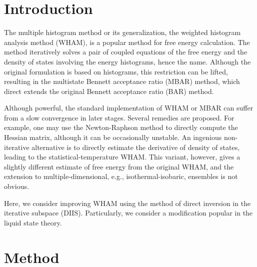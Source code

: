 \documentclass[aip,jcp,preprint,superscriptaddress]{revtex4-1}
\begin{document}
\newcommand{\vct}[1]{\mathbf{#1}}
\newcommand{\vx}{\vct{x}}
\newcommand{\Z}{\mathcal{Z}}
\newcommand{\E}{\mathcal{E}}





\section{Introduction}





The multiple histogram method\cite{
ferrenberg1988, *ferrenberg1989}
or its generalization,
the weighted histogram analysis method (WHAM)\cite{
kumar1992, souaille2001, kastner2005,
chodera2007, bereau2009,
kim2011},
is a popular method
for free energy calculation.
%
The method iteratively solves a pair of coupled equations of
the free energy and the density of states
involving the energy histograms, hence the name.
%
Although the original formulation is
based on histograms,
this restriction can be lifted,
resulting in the
multistate Bennett acceptance ratio (MBAR) method\cite{
shirts2008},
which direct extends the original
Bennett acceptance ratio (BAR) method\cite{
bennett1976}.



Although powerful,
the standard implementation of WHAM or MBAR can suffer from
a slow convergence in later stages.
%
Several remedies are proposed\cite{
 shirts2008, bereau2009, kim2011}.
%
For example, one may use the Newton-Raphson method
to directly compute the Hessian matrix\cite{
shirts2008},
although it can be occasionally unstable.
%
An ingenious non-iterative alternative
is to directly estimate the derivative of density of states,
leading to the statistical-temperature WHAM\cite{
kim2011}.
%
This variant, however, gives
a slightly different estimate of free energy
from the original WHAM,
and the extension to multiple-dimensional,
e.g., isothermal-isobaric, ensembles
is not obvious.



Here, we consider improving WHAM using
the method of direct inversion in the iterative subspace (DIIS)\cite{
pulay1980, *pulay1982, *hamilton1986}.
%
Particularly, we consider a modification
popular in the liquid state theory\cite{
kovalenko1999, howard2011}.





\section{Method}
\end{document}
